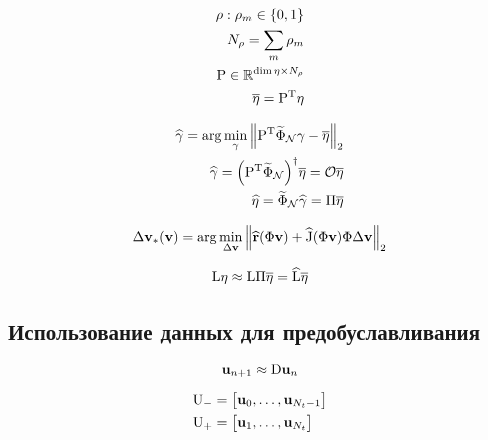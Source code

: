 \begin{align}
   \bvec{\rho} : \rho_m \in \left\{0, 1 \right\} \\
   N_{\bvec{\rho}} = \sum_m \rho_m \\
   \matr{P} \in \mathbb{R}^{\dim{\nlin} \times N_{\bvec{\rho}}} \\
   \overline{\nlin} = \transpose{P} \nlin
\end{align}

\begin{align}
    \widehat{\bvec{\gamma}} = \arg \min_{\bvec{\gamma}} \norm[2]{\transpose{P} \widetilde{\Phi}_\mathcal{N} \bvec{\gamma} - \overline{\nlin}} \\
    \widehat{\bvec{\gamma}} = {\left( \transpose{P} \widetilde{\Phi}_\mathcal{N} \right)}^\dagger \overline{\nlin} = \mathcal{O} \overline{\nlin} \\
    \widehat{\nlin} = \widetilde{\Phi}_\mathcal{N} \widehat{\bvec{\gamma}} = \matr{\Pi} \overline{\nlin}
\end{align}


\begin{align}
    \dvunk_\ast (\vunk)= \arg \min_{\dvunk} \norm[2]{\widehat{\resid}(\Phi \vunk) + \widehat{\jac}(\Phi \vunk) \Phi \dvunk}
\end{align}

\begin{align}
    \matr{\matr{L}} \nlin \approx
    \matr{\matr{L}} \matr{\Pi} \overline{\nlin} = \widehat{\matr{\matr{L}}} \overline{\nlin}
\end{align}

\subsection{Использование данных для предобуславливания}

\begin{equation}
    \unk_{n+1} \approx \matr{D} \unk_{n}
\end{equation}

\begin{align}
    \matr{U}_{-} &=
    \begin{bmatrix}
        \unk_0, \dots, \unk_{N_t-1}
    \end{bmatrix}\\
    \matr{U}_{+} &=
    \begin{bmatrix}
        \unk_1, \dots, \unk_{N_t}
    \end{bmatrix}
\end{align}

